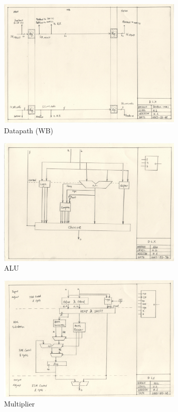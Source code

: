 \begin{figure}[Ht]
    \centering
    \includegraphics[width=0.8\textwidth]{fig/dp5.jpg}
    \caption{Datapath (WB)}
    \label{fig:dp5}
\end{figure}
\begin{figure}[Ht]
    \centering
    \includegraphics[width=0.8\textwidth]{fig/alu.jpg}
    \caption{ALU}
    \label{fig:alu}
\end{figure}
\begin{figure}[Ht]
    \centering
    \includegraphics[width=0.8\textwidth]{fig/mul.jpg}
    \caption{Multiplier}
    \label{fig:mul}
\end{figure}
